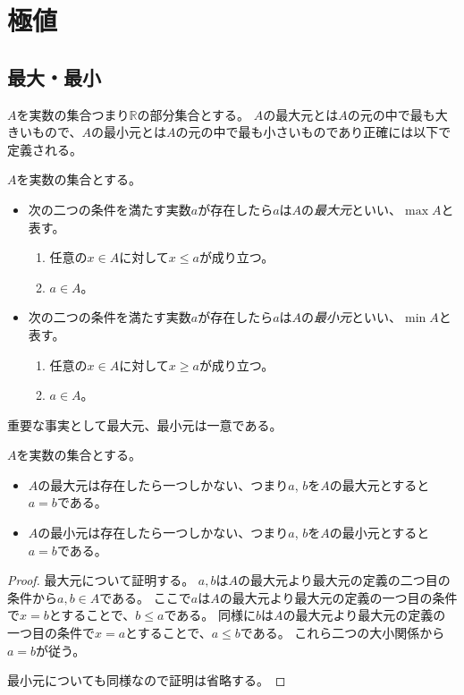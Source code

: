 
\chapter{極値}

\section{最大・最小}

$A$を実数の集合つまり$\mathbb{R}$の部分集合とする。
$A$の最大元とは$A$の元の中で最も大きいもので、$A$の最小元とは$A$の元の中で最も小さいものであり正確には以下で定義される。

\begin{definition}[集合の最大元と最小元]
\label{d_max}
$A$を実数の集合とする。
\begin{itemize}
\item
次の二つの条件を満たす実数$a$が存在したら$a$は$A$の\emph{最大元}といい、$\max A$と表す。
\begin{enumerate}
\item
任意の$x \in A$に対して$x \le a$が成り立つ。
\item
$a \in A$。
\end{enumerate}
\item
次の二つの条件を満たす実数$a$が存在したら$a$は$A$の\emph{最小元}といい、$\min A$と表す。
\begin{enumerate}
\item
任意の$x \in A$に対して$x \ge a$が成り立つ。
\item
$a \in A$。
\end{enumerate}
\end{itemize}
\end{definition}

重要な事実として最大元、最小元は一意である。

\begin{proposition}
$A$を実数の集合とする。
\begin{itemize}
\item
$A$の最大元は存在したら一つしかない、つまり$a$, $b$を$A$の最大元とすると$a = b$である。
\item
$A$の最小元は存在したら一つしかない、つまり$a$, $b$を$A$の最小元とすると$a = b$である。
\end{itemize}
\end{proposition}

\begin{proof}
最大元について証明する。
$a, b$は$A$の最大元より最大元の定義の二つ目の条件から$a, b \in A$である。
ここで$a$は$A$の最大元より最大元の定義の一つ目の条件で$x = b$とすることで、$b \le a$である。
同様に$b$は$A$の最大元より最大元の定義の一つ目の条件で$x = a$とすることで、$a \le b$である。
これら二つの大小関係から$a = b$が従う。

最小元についても同様なので証明は省略する。
\end{proof}

